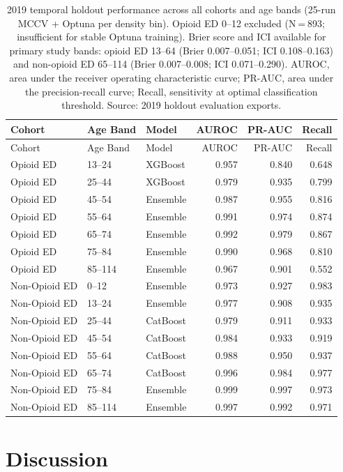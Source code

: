 \documentclass[
  12pt,
]{book}
\begin{document}
\begin{longtable}[]{@{}lllrrr@{}}
\caption{2019 temporal holdout performance across all cohorts and age
bands (25-run MCCV + Optuna per density bin). Opioid ED 0--12 excluded
(N = 893; insufficient for stable Optuna training). Brier score and ICI
available for primary study bands: opioid ED 13--64 (Brier 0.007--0.051;
ICI 0.108--0.163) and non-opioid ED 65--114 (Brier 0.007--0.008; ICI
0.071--0.290). AUROC, area under the receiver operating characteristic
curve; PR-AUC, area under the precision-recall curve; Recall,
sensitivity at optimal classification threshold. Source: 2019 holdout
evaluation exports.}\label{tbl-validation}\tabularnewline
\toprule\noalign{}
Cohort & Age Band & Model & AUROC & PR-AUC & Recall \\
\midrule\noalign{}
\endfirsthead
\toprule\noalign{}
Cohort & Age Band & Model & AUROC & PR-AUC & Recall \\
\midrule\noalign{}
\endhead
\bottomrule\noalign{}
\endlastfoot
Opioid ED & 13--24 & XGBoost & 0.957 & 0.840 & 0.648 \\
Opioid ED & 25--44 & XGBoost & 0.979 & 0.935 & 0.799 \\
Opioid ED & 45--54 & Ensemble & 0.987 & 0.955 & 0.816 \\
Opioid ED & 55--64 & Ensemble & 0.991 & 0.974 & 0.874 \\
Opioid ED & 65--74 & Ensemble & 0.992 & 0.979 & 0.867 \\
Opioid ED & 75--84 & Ensemble & 0.990 & 0.968 & 0.810 \\
Opioid ED & 85--114 & Ensemble & 0.967 & 0.901 & 0.552 \\
Non-Opioid ED & 0--12 & Ensemble & 0.973 & 0.927 & 0.983 \\
Non-Opioid ED & 13--24 & Ensemble & 0.977 & 0.908 & 0.935 \\
Non-Opioid ED & 25--44 & CatBoost & 0.979 & 0.911 & 0.933 \\
Non-Opioid ED & 45--54 & CatBoost & 0.984 & 0.933 & 0.919 \\
Non-Opioid ED & 55--64 & CatBoost & 0.988 & 0.950 & 0.937 \\
Non-Opioid ED & 65--74 & CatBoost & 0.996 & 0.984 & 0.977 \\
Non-Opioid ED & 75--84 & Ensemble & 0.999 & 0.997 & 0.973 \\
Non-Opioid ED & 85--114 & Ensemble & 0.997 & 0.992 & 0.971 \\
\end{longtable}

\chapter{Discussion}\label{sec-discussion}
\end{document}
